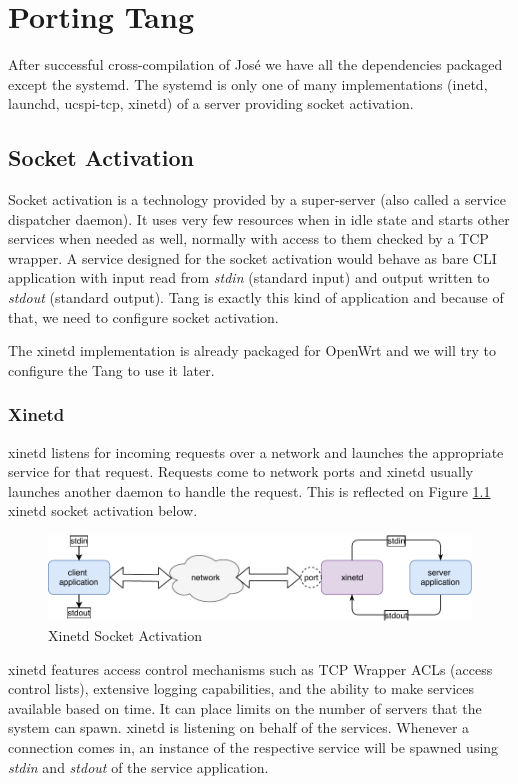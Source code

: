 \chapter{Porting Tang}\label{porting-tang}

After successful cross-compilation of José we have all the dependencies packaged except the systemd.
The systemd is only one of many implementations (inetd, launchd, ucspi-tcp, xinetd) of a server providing socket activation.



\section{Socket Activation}\label{socket_activation}

Socket activation is a technology provided by a super-server (also called a service dispatcher daemon).
It uses very few resources when in idle state and starts other services when needed as well, normally with access to them checked by a TCP wrapper.
A service designed for the socket activation would behave as bare CLI application with input read from {\it stdin} (standard input) and output written to {\it stdout} (standard output).
Tang is exactly this kind of application and because of that, we need to configure socket activation.

The xinetd implementation is already packaged for OpenWrt and we will try to configure the Tang to use it later.



\subsection{Xinetd}
xinetd listens for incoming requests over a network and launches the appropriate service for that request.
Requests come to network ports and xinetd usually launches another daemon to handle the request.
This is reflected on Figure \ref{fig_xinetd} xinetd socket activation below.
\begin{figure}[h]
    \centering
    \includegraphics[scale=0.9]{figures/xinetd.pdf}
    \caption{Xinetd Socket Activation}
    \label{fig_xinetd}
\end{figure}
xinetd features access control mechanisms such as TCP Wrapper ACLs (access control lists), extensive logging capabilities, and the ability to make services available based on time.
It can place limits on the number of servers that the system can spawn.
xinetd is listening on behalf of the services.
Whenever a connection comes in, an instance of the respective service will be spawned using {\it stdin} and {\it stdout} of the service application\cite{xinetd}.


